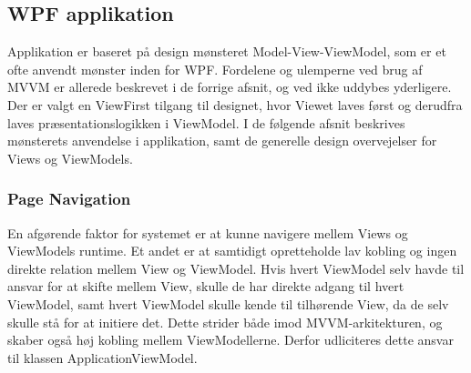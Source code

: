 \documentclass[Rapport/Rapport_main.tex]{subfiles}
\begin{document}
\subsection{WPF applikation}
Applikation er baseret på design mønsteret Model-View-ViewModel, som er et ofte anvendt mønster inden for WPF. Fordelene og ulemperne ved brug af MVVM er allerede beskrevet i de forrige afsnit, og ved ikke uddybes yderligere. Der er valgt en ViewFirst tilgang til designet, hvor Viewet laves først og derudfra laves præsentationslogikken i ViewModel. I de følgende afsnit beskrives mønsterets anvendelse i applikation, samt de generelle design overvejelser for Views og ViewModels. 

\subsubsection{Page Navigation}
En afgørende faktor for systemet er at kunne navigere mellem Views og ViewModels runtime. Et andet er at samtidigt opretteholde lav kobling og ingen direkte relation mellem View og ViewModel. Hvis hvert ViewModel selv havde til ansvar for at skifte mellem View, skulle de har direkte adgang til hvert ViewModel, samt hvert ViewModel skulle kende til tilhørende View, da de selv skulle stå for at initiere det. Dette strider både imod MVVM-arkitekturen, og skaber også høj kobling mellem ViewModellerne. Derfor udliciteres dette ansvar til klassen ApplicationViewModel. 
\end{document}
